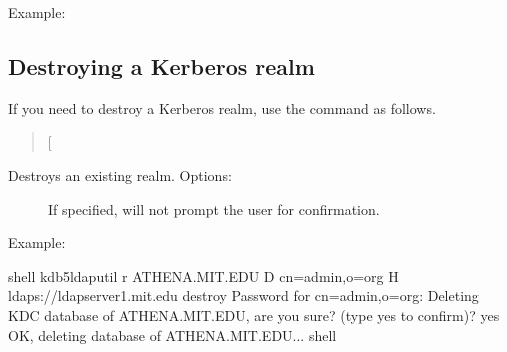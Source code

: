 \documentclass[letterpaper,10pt,english]{sphinxmanual}
\begin{document}
Example:

%
\begin{sphinxVerbatim}[commandchars=\\\{\}]
      
      
  
\end{sphinxVerbatim}


\subsection{Destroying a Kerberos realm}
\label{\detokenize{admin/database:destroying-a-kerberos-realm}}
If you need to destroy a Kerberos realm, use the
{\hyperref[\detokenize{admin/admin_commands/kdb5_ldap_util:kdb5-ldap-util-8}]{}}  command as follows.
\begin{quote}

 {[}\sphinxstylestrong{-f}{]}
\end{quote}

Destroys an existing realm. Options:
\begin{description}
\item[{}] \leavevmode
If specified, will not prompt the user for confirmation.

\end{description}

Example:

%
\begin{sphinxVerbatim}[commandchars=\\\{\}]
shell\PYGZpc{} kdb5\PYGZus{}ldap\PYGZus{}util \PYGZhy{}r ATHENA.MIT.EDU \PYGZhy{}D cn=admin,o=org \PYGZhy{}H
    ldaps://ldap\PYGZhy{}server1.mit.edu destroy
Password for \PYGZdq{}cn=admin,o=org\PYGZdq{}:
Deleting KDC database of \PYGZsq{}ATHENA.MIT.EDU\PYGZsq{}, are you sure?
(type \PYGZsq{}yes\PYGZsq{} to confirm)? yes
OK, deleting database of \PYGZsq{}ATHENA.MIT.EDU\PYGZsq{}...
shell\PYGZpc{}
\end{sphinxVerbatim}
\end{document}
